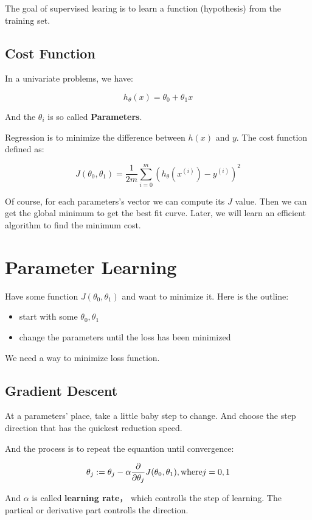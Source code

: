 \documentclass[en,11pt,english,black,simple]{../elegantbook}
\begin{document}
The goal of supervised learing is to learn a function (hypothesis) from the training set.

\subsection{Cost Function} 

In a univariate problems, we have:

\[
h_\theta(x) = \theta_0 + \theta_1 x    
\]

And the \(\theta_i\) is so called \textbf{Parameters}.

Regression is to minimize the difference between \(h(x)\) and \(y\). The cost function defined as: 

\[
J (\theta_0, \theta_1) = \frac{1}{2 m} \sum_{i = 0}^{m} \left(h_\theta(x^{(i)}) - y^{(i)}\right)^2
\]

Of course, for each parameters's vector we can compute its \(J\) value. Then we can get the global minimum to get the best fit curve. Later, we will learn an efficient algorithm to find the minimum cost.

\section{Parameter Learning}

Have some function \(J(\theta_0, \theta_1)\) and want to minimize it. Here is the outline:

\begin{itemize}
    \item start with some \(\theta_0, \theta_1\)
    \item change the parameters until the loss has been minimized
\end{itemize}

We need a way to minimize loss function. 

\subsection{Gradient Descent}

At a parameters' place, take a little baby step to change. And choose the step direction that has the quickest reduction speed.

And the process is to repeat the equantion until convergence:

\[\theta_j := \theta_j - \alpha \frac{\partial{}}{\partial{}\theta_j}J(\theta_0, \theta_1), \text{where} j = 0, 1\]

And \(\alpha\) is called \textbf{learning rate}， which controlls the step of learning. The partical or derivative part controlls the direction.
\end{document}
